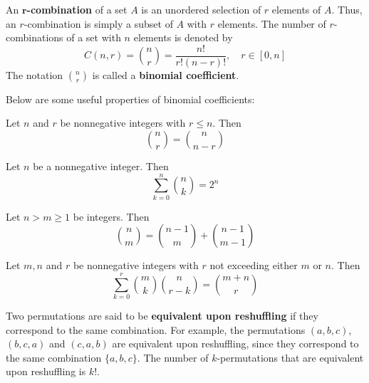 \begin{definition}[$r$-Combination]
    An \textbf{$\bm{r}$-combination} of a set $A$ is an unordered selection of $r$ elements of $A$.
    Thus, an $r$-combination is simply a subset of $A$ with $r$ elements. The number of
    $r$-combinations of a set with $n$ elements is denoted by
    \[
        C(n,r) = \binom{n}{r} = \frac{n!}{r!(n-r)!},\quad r\in[0,n]
    \]
    The notation $\binom{n}{r}$ is called a \textbf{binomial coefficient}.
\end{definition}

Below are some useful properties of binomial coefficients:

\begin{corollary}
    Let $n$ and $r$ be nonnegative integers with $r \leq n$. Then
    \[
        \binom{n}{r} = \binom{n}{n-r}
    \]
\end{corollary}

\begin{corollary}
    Let $n$ be a nonnegative integer. Then
    \[
        \sum_{k=0}^n \binom{n}{k} = 2^n
    \]
\end{corollary}

\begin{corollary}
    Let $n>m\geq 1$ be integers. Then
    \[
        \binom{n}{m} = \binom{n-1}{m} + \binom{n-1}{m-1}
    \]
\end{corollary}

\begin{theorem}
    Let $m,n$ and $r$ be nonnegative integers with $r$ not exceeding either $m$ or $n$. Then
    \[
        \sum_{k=0}^r \binom{m}{k} \binom{n}{r-k} = \binom{m+n}{r}
    \]
\end{theorem}

\begin{definition}
    Two permutations are said to be \textbf{equivalent upon reshuffling} if they correspond
    to the same combination. For example, the permutations $(a,b,c)$, $(b,c,a)$ and $(c,a,b)$
    are equivalent upon reshuffling, since they correspond to the same combination $\{a,b,c\}$.
    The number of $k$-permutations that are equivalent upon reshuffling is $k!$.
\end{definition}